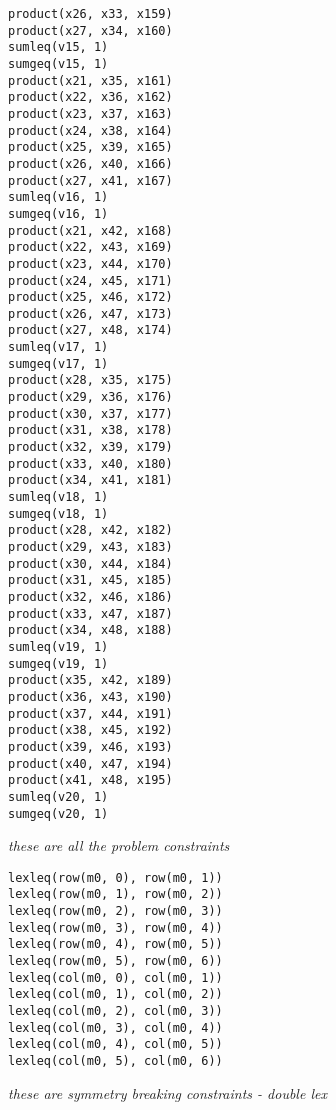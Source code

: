 \documentclass{article}
\begin{document}
\begin{small}
\begin{verbatim}
product(x26, x33, x159)
product(x27, x34, x160)
sumleq(v15, 1)
sumgeq(v15, 1)
product(x21, x35, x161)
product(x22, x36, x162)
product(x23, x37, x163)
product(x24, x38, x164)
product(x25, x39, x165)
product(x26, x40, x166)
product(x27, x41, x167)
sumleq(v16, 1)
sumgeq(v16, 1)
product(x21, x42, x168)
product(x22, x43, x169)
product(x23, x44, x170)
product(x24, x45, x171)
product(x25, x46, x172)
product(x26, x47, x173)
product(x27, x48, x174)
sumleq(v17, 1)
sumgeq(v17, 1)
product(x28, x35, x175)
product(x29, x36, x176)
product(x30, x37, x177)
product(x31, x38, x178)
product(x32, x39, x179)
product(x33, x40, x180)
product(x34, x41, x181)
sumleq(v18, 1)
sumgeq(v18, 1)
product(x28, x42, x182)
product(x29, x43, x183)
product(x30, x44, x184)
product(x31, x45, x185)
product(x32, x46, x186)
product(x33, x47, x187)
product(x34, x48, x188)
sumleq(v19, 1)
sumgeq(v19, 1)
product(x35, x42, x189)
product(x36, x43, x190)
product(x37, x44, x191)
product(x38, x45, x192)
product(x39, x46, x193)
product(x40, x47, x194)
product(x41, x48, x195)
sumleq(v20, 1)
sumgeq(v20, 1)
\end{verbatim}
\emph{these are all the problem constraints}
\begin{verbatim}
lexleq(row(m0, 0), row(m0, 1))
lexleq(row(m0, 1), row(m0, 2))
lexleq(row(m0, 2), row(m0, 3))
lexleq(row(m0, 3), row(m0, 4))
lexleq(row(m0, 4), row(m0, 5))
lexleq(row(m0, 5), row(m0, 6))
lexleq(col(m0, 0), col(m0, 1))
lexleq(col(m0, 1), col(m0, 2))
lexleq(col(m0, 2), col(m0, 3))
lexleq(col(m0, 3), col(m0, 4))
lexleq(col(m0, 4), col(m0, 5))
lexleq(col(m0, 5), col(m0, 6))
\end{verbatim}
\emph{these are symmetry breaking constraints - double lex}
\end{small}
\end{document}
